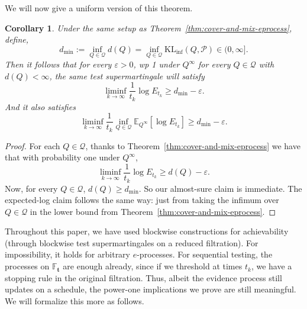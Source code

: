 \documentclass[11pt]{article}
\newcommand{\KLinf}{\mathrm{KL}_{\mathrm{inf}}}
\newcommand{\E}{\mathbb{E}}
\newcommand{\Pcal}{\mathcal{P}}
\newcommand{\Qcal}{\mathcal{Q}}
\newcommand{\bbF}{\mathbb F}
\newcommand{\bt}{\mathbf t}
\newtheorem{corollary}[theorem]{Corollary}
\theoremstyle{definition}
\theoremstyle{definition}
\begin{document}
We will now give a uniform version of this theorem. 

\begin{corollary}\label{cor:uniform-cover-and-mix}
Under the same setup as Theorem~\ref{thm:cover-and-mix-eprocess}, define,
\[
d_{\min}:=\inf_{Q\in\Qcal} d(Q)=\inf_{Q\in\Qcal}\KLinf(Q,\Pcal)\in(0,\infty].
\]
Then it follows that for every $\varepsilon>0$, wp 1 under $Q^\infty$ for every $Q\in\Qcal$ with $d(Q)<\infty$, the same test supermartingale will satisfy
\[
\boxed{
\liminf_{k\to\infty}\frac{1}{t_k}\log E_{t_k} \ge d_{\min}-\varepsilon.
}
\]
And it also satisfies
\[
\boxed{
\liminf_{k\to\infty}\frac{1}{t_k}\inf_{Q\in\Qcal}\E_{Q^\infty}[\log E_{t_k}]\ge d_{\min}-\varepsilon.
}
\]
\end{corollary}

\begin{proof}
For each $Q\in\Qcal$, thanks to Theorem~\ref{thm:cover-and-mix-eprocess} we have that with probability one under $Q^\infty$,
\[
\liminf_{k\to\infty}\frac{1}{t_k}\log E_{t_k} \ge d(Q)-\varepsilon.
\]
Now, for every $Q\in\Qcal$, $d(Q)\ge d_{\mathrm{min}}$. So our almost-sure claim is immediate. The expected-log claim follows the same way: just from taking the infimum over $Q\in\Qcal$ in the lower bound from Theorem~\ref{thm:cover-and-mix-eprocess}.
\end{proof}

Throughout this paper, we have used blockwise constructions for achievability (through blockwise test supermartingales on a reduced filtration). For impossibility, it holds for arbitrary $e$-processes. For sequential testing, the processes on $\bbF_{\bt}$ are enough already, since if we threshold at times $t_k$, we have a stopping rule in the original filtration. Thus, albeit the evidence process still updates on a schedule, the power-one implications we prove are still meaningful. We will formalize this more as follows.
\end{document}
